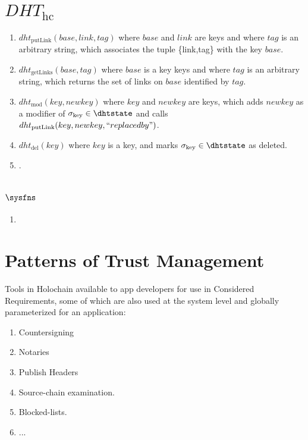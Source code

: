 \documentclass[twocolumn,showpacs,%
  nofootinbib,aps,superscriptaddress,%
  eqsecnum,prd,notitlepage,showkeys,10pt]{revtex4-1}
\begin{document}
\section{$DHT_\text{hc}$}
\label{apdx:dhtfn}
\begin{enumerate}

\item $dht_\text{putLink}(base,link,tag)$ where $base$ and $link$ are keys and where $tag$ is an arbitrary string, which associates the tuple \{link,tag\} with the key $base$.
\item $dht_\text{getLinks}(base,tag)$ where $base$ is a key keys and where $tag$ is an arbitrary string, which returns the set of links on $base$ identified by $tag$.
\item $dht_\text{mod}(key,newkey)$ where $key$ and $newkey$ are keys, which adds $newkey$ as a modifier of $\sigma_\text{key} \in \dhtstate$ and calls $dht_\text{putLink}(key,newkey,``replacedby")$.
\item $dht_\text{del}(key)$ where $key$ is a key, and marks $\sigma_\text{key} \in \dhtstate$ as deleted.
\item {}.
\end{enumerate}

\section{$\sysfns$}
\label{apdx:sysfn}
\begin{enumerate}
\item {}
\end{enumerate}

\section{Patterns of Trust Management}
\label{apdx:trust}

Tools in Holochain available to app developers for use in Considered Requirements, some of which are also used at the system level and globally parameterized for an application:
\begin{enumerate}
\item Countersigning 
\item Notaries 
\item Publish Headers  
\item Source-chain examination.  
\item Blocked-lists. 
\item ... 
\end {enumerate}
\end{document}
